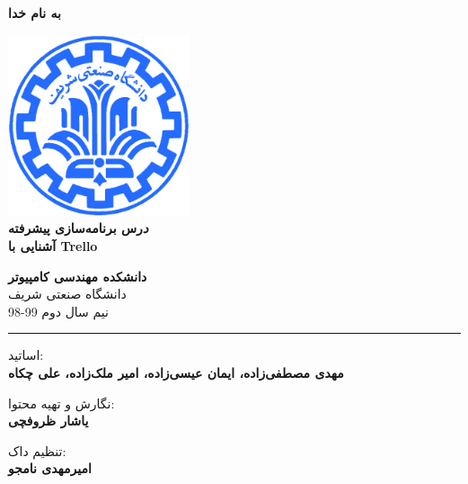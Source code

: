 \documentclass[]{article}
\begin{document}
\begin{titlepage}
\begin{center}

\textbf{ \Huge{به نام خدا} }
        
\vspace{0.2cm}

\includegraphics[width=0.4\textwidth]{sharif1.png}\\
\vspace{0.2cm}
\textbf{ \Huge{\emph درس برنامه‌سازی پیشرفته} }\\
\vspace{0.25cm}
\textbf{ \Large{ آشنایی با Trello} }
\vspace{0.2cm}
       
 
      \large \textbf{دانشکده مهندسی کامپیوتر}\\\vspace{0.1cm}
    \large   دانشگاه صنعتی شریف\\\vspace{0.2cm}
       \large   ﻧﯿﻢ سال دوم 99-98 \\\vspace{0.10cm}
      \noindent\rule[1ex]{\linewidth}{1pt}
اساتید:\\
    \textbf{{مهدی مصطفی‌زاده، ایمان عیسی‌زاده، امیر ملک‌زاده، علی چکاه}}



        \vspace{0.10cm}
نگارش و تهیه محتوا:\\
    \textbf{{یاشار ظروفچی}}
    
       \vspace{0.10cm}
       تنظیم داک:\\
    \textbf{{امیرمهدی نامجو}}

    
        \vspace{0.05cm}

\end{center}
\end{titlepage}
\end{document}
